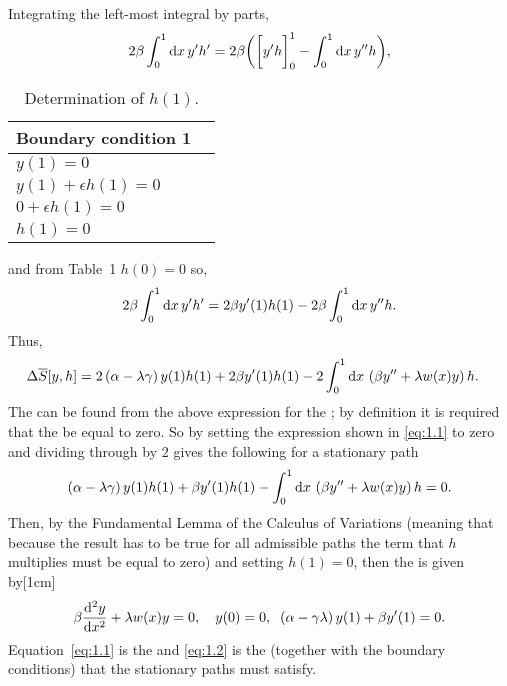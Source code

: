Integrating the left-most integral by parts,
\[
	2\beta\int_{0}^{1}\mathrm{d} x\,  y^{\prime}h^\prime = 2\beta\bigg(\bigg[y^\prime h\bigg]_0^1 - \int_{0}^{1}\mathrm{d} x\, y^{\prime\prime} h \bigg),
\]
\begin{table}[h!]
\centering
\begin{tabular}{ll}
\hline
Boundary condition 1         \\ \hline
$y(1)=0$                                 \\
$y(1) + \epsilon h(1)=0$  \\
$0 + \epsilon h(1) = 0$    \\
$\boxed{h(1) =0}$                              
\end{tabular}
\caption{Determination of $h(1)$.}
\label{table_1}
\end{table}
and from Table~1 $h(0)=0$ so,
\[
	2\beta\int_{0}^{1}\mathrm{d} x\,  y^{\prime}h^\prime = 2\beta y^\prime(1) h(1) - 2\beta\int_{0}^{1}\mathrm{d} x\, y^{\prime\prime} h.
\]
Thus,
\begin{align}
\label{eq:1.1}
	\Delta \overline{S}[y,h] &=
	2\left(\alpha- \lambda\gamma\right) y(1)h(1) + 2\beta y^\prime(1) h(1) - 2\int_{0}^{1}\mathrm{d} x\, \left(\beta y^{{\prime\prime}}+\lambda w(x) y\right) h.
\end{align}
The \el can be found from the above expression for the \gd; by definition it is required that the \gd be equal to zero.  So by setting the expression shown in \eqref{eq:1.1} to zero and dividing through by $2$ gives the following for a stationary path
\begin{equation*}
	\left(\alpha- \lambda\gamma\right) y(1)h(1) + \beta y^\prime(1) h(1) - \int_{0}^{1}\mathrm{d} x\, \left(\beta y^{{\prime\prime}}+\lambda w(x) y\right) h =0.
\end{equation*}
Then, by the Fundamental Lemma of the Calculus of Variations (meaning that because the result has to be true for all admissible paths the term that $h$ multiplies must be equal to zero) and setting $h(1)=0$, then the \el is given by[1cm]
\begin{equation}
\label{eq:1.2}
	\beta\frac{\mathrm{d}^2y}{\mathrm{d}x^2} + \lambda w(x) y =0,\quad y(0) = 0,\;\;\left(\alpha - \gamma \lambda\right) y(1) + \beta y^\prime(1) = 0.
\end{equation}
Equation~\eqref{eq:1.1} is the \gd and \eqref{eq:1.2} is the \el (together with the boundary conditions) that the stationary paths must satisfy.
